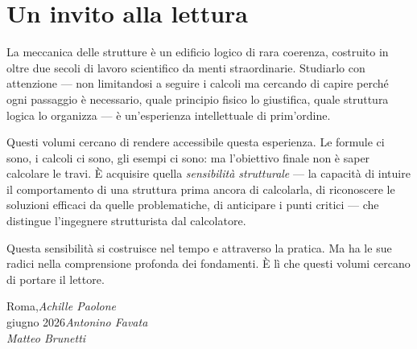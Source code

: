 \section*{Un invito alla lettura}

La meccanica delle strutture è un edificio logico di rara coerenza, costruito in oltre due secoli di lavoro scientifico da menti straordinarie. Studiarlo con attenzione --- non limitandosi a seguire i calcoli ma cercando di capire perché ogni passaggio è necessario, quale principio fisico lo giustifica, quale struttura logica lo organizza --- è un'esperienza intellettuale di prim'ordine.

Questi volumi cercano di rendere accessibile questa esperienza. Le formule ci sono, i calcoli ci sono, gli esempi ci sono: ma l'obiettivo finale non è saper calcolare le travi. È acquisire quella \textit{sensibilità strutturale} --- la capacità di intuire il comportamento di una struttura prima ancora di calcolarla, di riconoscere le soluzioni efficaci da quelle problematiche, di anticipare i punti critici --- che distingue l'ingegnere strutturista dal calcolatore.

Questa sensibilità si costruisce nel tempo e attraverso la pratica. Ma ha le sue radici nella comprensione profonda dei fondamenti. È lì che questi volumi cercano di portare il lettore.




\vspace{\baselineskip}
\begin{flushright}\noindent
Roma,\hfill {\it Achille Paolone}\\
giugno 2026\hfill {\it Antonino Favata}\\
\hfill {\it Matteo Brunetti}\\
\end{flushright}
